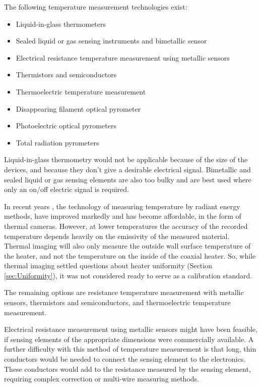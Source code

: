 The following temperature measurement technologies exist:
\begin{itemize}
	\item Liquid-in-glass thermometers
	\item Sealed liquid or gas sensing instruments and bimetallic sensor
	\item Electrical resistance temperature measurement using metallic sensors
	\item Thermistors and semiconductors
	\item Thermoelectric temperature measurement
	\item Disappearing filament optical pyrometer
	\item Photoelectric optical pyrometers
	\item Total radiation pyrometers
\end{itemize}

Liquid-in-glass thermometry would not be applicable because of the size of the
devices, and because they don't give a desirable electrical signal. Bimetallic
and sealed liquid or gas sensing elements are also too bulky and are best used
where only an on/off electric signal is required.

In recent years , the technology of measuring temperature by
radiant energy methods, have improved markedly and has become affordable, in the
form of thermal cameras. However, at lower temperatures the accuracy of the
recorded temperature depends heavily on the emissivity of the measured material.
Thermal imaging will also only measure the outside wall surface temperature of
the heater, and not the temperature on the inside of the coaxial heater. So,
while thermal imaging settled questions about heater uniformity (Section
\ref{sec:Uniformity}), it was not considered ready to serve as a calibration
standard.

The remaining options are resistance temperature measurement with metallic sensors,
thermistors and semiconductors, and thermoelectric temperature measurement.

Electrical resistance measurement using metallic sensors might have been
feasible, if sensing elements of the appropriate dimensions were commercially
available. A further difficulty with this method of temperature measurement is
that long, thin conductors would be needed to connect the sensing element to the
electronics. These conductors would add to the resistance measured by the
sensing element, requiring complex correction or multi-wire measuring methods.

